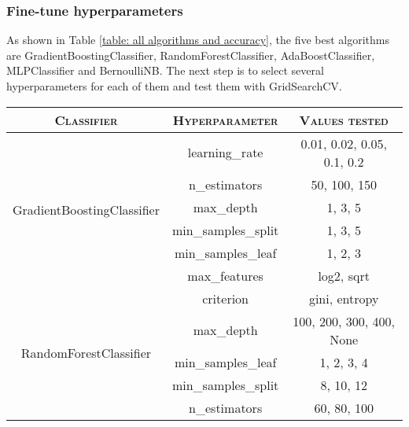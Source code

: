 \documentclass[12pt]{article}
\begin{document}
\subsubsection{Fine-tune hyperparameters}
As shown in Table \ref{table: all algorithms and accuracy}, the five best algorithms are GradientBoostingClassifier, RandomForestClassifier, AdaBoostClassifier, MLPClassifier and BernoulliNB. The next step is to select several hyperparameters for each of them and test them with GridSearchCV.
\begin{table}[ht]
    \centering
    \begin{tabular}{ccc}
        \toprule
        \textsc{Classifier}                         & \textsc{Hyperparameter} & \textsc{Values tested}              \\
        \midrule
        \multirow{6}{*}{GradientBoostingClassifier} & learning\_rate          & 0.01, 0.02, 0.05, 0.1, 0.2          \\
                                                    & n\_estimators           & 50, 100, 150                        \\
                                                    & max\_depth              & 1, 3, 5                             \\
                                                    & min\_samples\_split     & 1, 3, 5                             \\
                                                    & min\_samples\_leaf      & 1, 2, 3                             \\
                                                    & max\_features           & log2, sqrt                          \\
        \midrule
        \multirow{5}{*}{RandomForestClassifier}     & criterion               & gini, entropy                       \\
                                                    & max\_depth              & 100, 200, 300, 400, None            \\
                                                    & min\_samples\_leaf      & 1, 2, 3, 4                          \\
                                                    & min\_samples\_split     & 8, 10, 12                           \\
                                                    & n\_estimators           & 60, 80, 100                         \\
        \midrule

\end{tabular}
\end{table}
\end{document}

